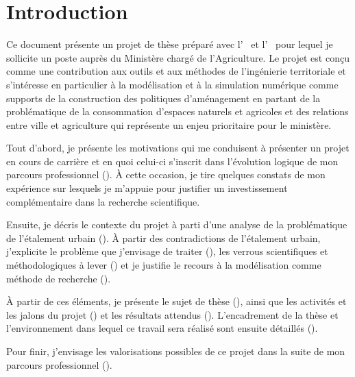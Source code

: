 \section
{Introduction}

Ce document présente un projet de thèse préparé avec l’{\UMR\ \EVS} et l’{\UMR\ \TETIS}
pour lequel je sollicite un poste {\FCPR} auprès du Ministère chargé de
l’Agriculture.
Le projet est conçu comme une contribution aux outils et aux méthodes
de l’ingénierie territoriale et s’intéresse en particulier à la modélisation
et à la simulation numérique comme supports de la construction
des politiques d'aménagement en partant de la problématique de la consommation d’espaces
naturels et agricoles et des relations entre ville et agriculture
qui représente un enjeu prioritaire pour le ministère.

Tout d’abord, je présente les motivations qui me conduisent à présenter un
projet {\FCPR}  en cours de carrière et en quoi celui-ci s’inscrit dans l'évolution logique
de mon parcours professionnel (\in[origin]). À cette
occasion, je tire quelques constats de mon expérience sur lesquels
je m'appuie pour justifier un investissement complémentaire dans la recherche
scientifique.

Ensuite, je décris le contexte du projet à parti d’une analyse de la
problématique de l’étalement urbain (\in[contexte]). À partir des contradictions
de l'étalement urbain, j'explicite le problème que j'envisage de traiter (\in[probleme]),
les verrous scientifiques et méthodologiques à lever (\in[verrous]) et je justifie
le recours à la modélisation comme méthode de recherche (\in[methodo]).

À partir de ces éléments, je présente le sujet de thèse (\in[sujet]),
ainsi que les activités et les jalons du projet (\in[planning])
et les résultats attendus (\in[resultats]).
L'encadrement de la thèse et l'environnement dans lequel ce travail
sera réalisé sont ensuite détaillés (\in[environnement]).

Pour finir, j’envisage les valorisations possibles de ce projet dans la suite de mon
parcours professionnel (\in[suites]).